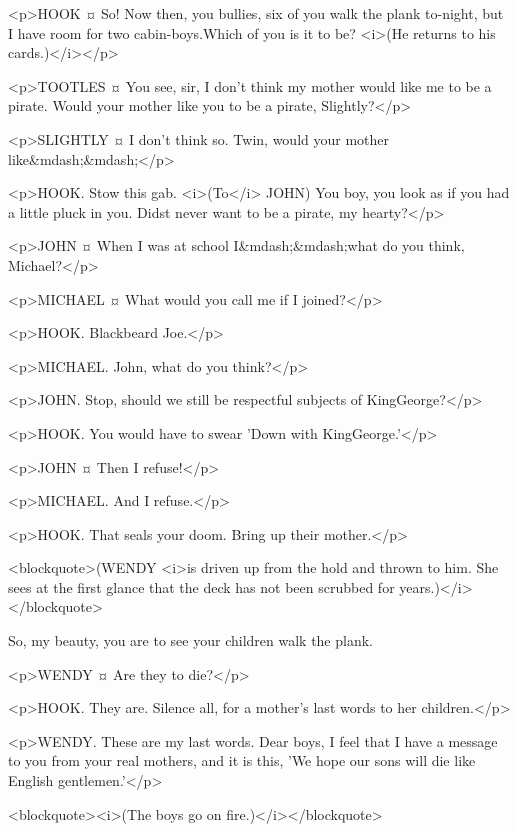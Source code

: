 <p>HOOK ¤
So! Now then, you bullies, six of you walk the plank to-night, but I have room for two cabin-boys.Which of you is it to be? <i>(He returns to his cards.)</i></p>

<p>TOOTLES ¤
You see, sir, I don't think my mother would like me to be a pirate. Would your mother like you to be a pirate, Slightly?</p>

<p>SLIGHTLY ¤
I don't think so. Twin, would your mother like&mdash;&mdash;</p>

<p>HOOK. Stow this gab. <i>(To</i> JOHN) You boy, you look as if you had a little pluck in you. Didst never want to be a pirate, my hearty?</p>

<p>JOHN ¤
When I was at school I&mdash;&mdash;what do you think, Michael?</p>

<p>MICHAEL ¤
What would you call me if I joined?</p>

<p>HOOK. Blackbeard Joe.</p>

<p>MICHAEL. John, what do you think?</p>

<p>JOHN. Stop, should we still be respectful subjects of KingGeorge?</p>

<p>HOOK. You would have to swear 'Down with KingGeorge.'</p>

<p>JOHN ¤
Then I refuse!</p>

<p>MICHAEL. And I refuse.</p>

<p>HOOK. That seals your doom. Bring up their mother.</p>

<blockquote>(WENDY <i>is driven up from the hold and thrown to him. She sees at the first glance that the deck has not been scrubbed for years.)</i></blockquote>

So, my beauty, you are to see your children walk the plank. 

<p>WENDY ¤
Are they to die?</p>

<p>HOOK. They are. Silence all, for a mother's last words to her children.</p>

<p>WENDY. These are my last words. Dear boys, I feel that I have a message to you from your real mothers, and it is this, 'We hope our sons will die like English gentlemen.'</p>

<blockquote><i>(The boys go on fire.)</i></blockquote>

